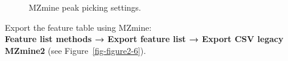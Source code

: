 \documentclass[
  letterpaper,
  DIV=11,
  numbers=noendperiod]{scrreprt}
\begin{document}
\begin{figure}


\caption{\label{fig-figure2-5}MZmine peak picking settings.}

\end{figure}%

Export the feature table using MZmine:\\
\textbf{Feature list methods → Export feature list → Export CSV legacy
MZmine2} (see Figure~\ref{fig-figure2-6}).
\end{document}

